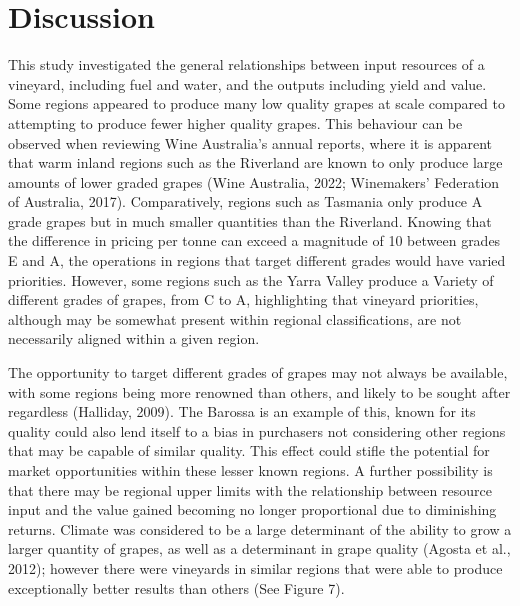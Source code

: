 \documentclass[
  journal=large,
  manuscript=article-type,
  year=2023,
  volume=?,
]{cup-journal}
\begin{document}
\section{Discussion}
This study investigated the general relationships between input resources of a vineyard, including fuel and water, and the outputs including yield and value. Some regions appeared to produce many low quality grapes at scale compared to attempting to produce fewer higher quality grapes. This behaviour can be observed when reviewing Wine Australia’s annual reports, where it is apparent that warm inland regions such as the Riverland are known to only produce large amounts of lower graded grapes (Wine Australia, 2022; Winemakers’ Federation of Australia, 2017). Comparatively, regions such as Tasmania only produce A grade grapes but in much smaller quantities than the Riverland. Knowing that the difference in pricing per tonne can exceed a magnitude of 10 between grades E and A, the operations in regions that target different grades would have varied priorities. However, some regions such as the Yarra Valley produce a Variety of different grades of grapes, from C to A, highlighting that vineyard priorities, although may be somewhat present within regional classifications, are not necessarily aligned within a given region. 

The opportunity to target different grades of grapes may not always be available, with some regions being more renowned than others, and likely to be sought after regardless (Halliday, 2009). The Barossa is an example of this, known for its quality could also lend itself to a bias in purchasers not considering other regions that may be capable of similar quality. This effect could stifle the potential for market opportunities within these lesser known regions. A further possibility is that there may be regional upper limits with the relationship between resource input and the value gained becoming no longer proportional due to diminishing returns. Climate was considered to be a large determinant of the ability to grow a larger quantity of grapes, as well as a determinant in grape quality (Agosta et al., 2012); however there were vineyards in similar regions that were able to produce exceptionally better results than others (See Figure 7).
\end{document}
